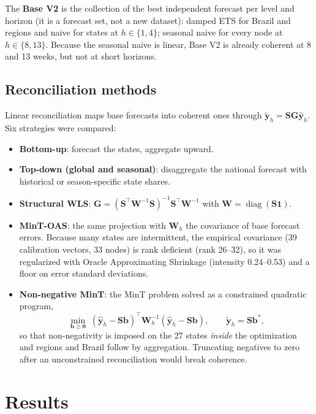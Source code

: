 \documentclass[12pt,a4paper]{article}
\begin{document}
The \textbf{Base V2} is the collection of the best independent forecast per level and horizon (it is a forecast set, not a new dataset): damped ETS for Brazil and regions and naive for states at $h\in\{1,4\}$; seasonal naive for every node at $h\in\{8,13\}$. Because the seasonal naive is linear, Base V2 is already coherent at 8 and 13 weeks, but not at short horizons.

\subsection{Reconciliation methods}
Linear reconciliation maps base forecasts into coherent ones through $\tilde{\mathbf{y}}_h=\mathbf{S}\mathbf{G}\hat{\mathbf{y}}_h$. Six strategies were compared:
\begin{itemize}\setlength\itemsep{0pt}
\item \textbf{Bottom-up}: forecast the states, aggregate upward.
\item \textbf{Top-down (global and seasonal)}: disaggregate the national forecast with historical or season-specific state shares.
\item \textbf{Structural WLS}: $\mathbf{G}=(\mathbf{S}^\top\mathbf{W}^{-1}\mathbf{S})^{-1}\mathbf{S}^\top\mathbf{W}^{-1}$ with $\mathbf{W}=\operatorname{diag}(\mathbf{S}\mathbf{1})$.
\item \textbf{MinT-OAS}: the same projection with $\mathbf{W}_h$ the covariance of base forecast errors. Because many states are intermittent, the empirical covariance (39 calibration vectors, 33 nodes) is rank deficient (rank 26--32), so it was regularized with Oracle Approximating Shrinkage (intensity 0.24--0.53) and a floor on error standard deviations.
\item \textbf{Non-negative MinT}: the MinT problem solved as a constrained quadratic program,
\begin{equation}
\min_{\mathbf{b}\ge \mathbf{0}}\;(\hat{\mathbf{y}}_h-\mathbf{S}\mathbf{b})^\top\mathbf{W}_h^{-1}(\hat{\mathbf{y}}_h-\mathbf{S}\mathbf{b}),\qquad \tilde{\mathbf{y}}_h=\mathbf{S}\mathbf{b}^\ast,
\end{equation}
so that non-negativity is imposed on the 27 states \emph{inside} the optimization and regions and Brazil follow by aggregation. Truncating negatives to zero after an unconstrained reconciliation would break coherence.
\end{itemize}

\section{Results}\label{sec:results}
\end{document}
